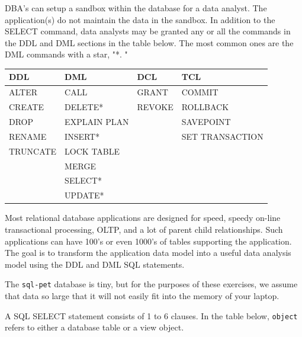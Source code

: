 \documentclass[]{book}
\theoremstyle{definition}
\theoremstyle{definition}
\theoremstyle{definition}
\theoremstyle{remark}
\begin{document}
DBA's can setup a sandbox within the database for a data analyst. The
application(s) do not maintain the data in the sandbox. In addition to
the SELECT command, data analysts may be granted any or all the commands
in the DDL and DML sections in the table below. The most common ones are
the DML commands with a star, "*. "

\begin{longtable}[]{@{}llll@{}}
\toprule
DDL & DML & DCL & TCL\tabularnewline
\midrule
\endhead
ALTER & CALL & GRANT & COMMIT\tabularnewline
CREATE & DELETE* & REVOKE & ROLLBACK\tabularnewline
DROP & EXPLAIN PLAN & & SAVEPOINT\tabularnewline
RENAME & INSERT* & & SET TRANSACTION\tabularnewline
TRUNCATE & LOCK TABLE & &\tabularnewline
& MERGE & &\tabularnewline
& SELECT* & &\tabularnewline
& UPDATE* & &\tabularnewline
\bottomrule
\end{longtable}

Most relational database applications are designed for speed, speedy
on-line transactional processing, OLTP, and a lot of parent child
relationships. Such applications can have 100's or even 1000's of tables
supporting the application. The goal is to transform the application
data model into a useful data analysis model using the DDL and DML SQL
statements.

The \texttt{sql-pet} database is tiny, but for the purposes of these
exercises, we assume that data so large that it will not easily fit into
the memory of your laptop.

A SQL SELECT statement consists of 1 to 6 clauses. In the table below,
\texttt{object} refers to either a database table or a view object.
\end{document}
